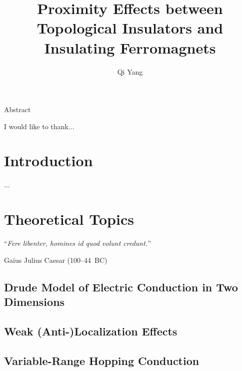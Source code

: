 ﻿\documentclass{report}
\begin{document}
\title{Proximity Effects between Topological Insulators and Insulating Ferromagnets}
\author{Qi Yang}

\keepXColumns

\beforepreface


    Abstract 


    I would like to thank...
\afterpreface

\captionsetup{width=0.95\columnwidth}%
\chapter{Introduction}\label{ch:intro}
    ...

\chapter{Theoretical Topics}\label{ch:theory}
\begin{refsection} 
\epigraph{``\textit{Fere libenter, homines id quod volunt credunt.}''}{Gaius Julius Caesar (100--44~BC)}
    \section{Drude Model of Electric Conduction in Two Dimensions}
        
    \section{Weak (Anti-)Localization Effects}\label{sec:wl}
        
    \section{Variable-Range Hopping Conduction}\label{sec:vrh}
        
    \printbibliography[heading=subbibintoc, title=References for Chapter~\ref{ch:theory}]
\end{refsection}	
\end{document}
